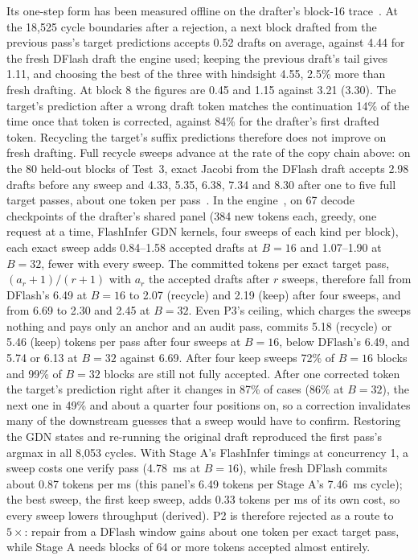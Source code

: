 Its one-step form has been measured offline on the drafter's block-16 trace~. At the 18,525 cycle boundaries after a rejection, a next block drafted from the previous pass's target predictions accepts 0.52 drafts on average, against 4.44 for the fresh DFlash draft the engine used; keeping the previous draft's tail gives 1.11, and choosing the best of the three with hindsight 4.55, 2.5\% more than fresh drafting. At block 8 the figures are 0.45 and 1.15 against 3.21 (3.30). The target's prediction after a wrong draft token matches the continuation 14\% of the time once that token is corrected, against 84\% for the drafter's first drafted token. Recycling the target's suffix predictions therefore does not improve on fresh drafting. Full recycle sweeps advance at the rate of the copy chain above: on the 80 held-out blocks of Test~3, exact Jacobi from the DFlash draft accepts 2.98 drafts before any sweep and 4.33, 5.35, 6.38, 7.34 and 8.30 after one to five full target passes, about one token per pass~. In the engine~, on 67 decode checkpoints of the drafter's shared panel (384 new tokens each, greedy, one request at a time, FlashInfer GDN kernels, four sweeps of each kind per block), each exact sweep adds 0.84--1.58 accepted drafts at $B=16$ and 1.07--1.90 at $B=32$, fewer with every sweep. The committed tokens per exact target pass, $(a_r+1)/(r+1)$ with $a_r$ the accepted drafts after $r$ sweeps, therefore fall from DFlash's 6.49 at $B=16$ to 2.07 (recycle) and 2.19 (keep) after four sweeps, and from 6.69 to 2.30 and 2.45 at $B=32$. Even P3's ceiling, which charges the sweeps nothing and pays only an anchor and an audit pass, commits 5.18 (recycle) or 5.46 (keep) tokens per pass after four sweeps at $B=16$, below DFlash's 6.49, and 5.74 or 6.13 at $B=32$ against 6.69. After four keep sweeps 72\% of $B=16$ blocks and 99\% of $B=32$ blocks are still not fully accepted. After one corrected token the target's prediction right after it changes in 87\% of cases (86\% at $B=32$), the next one in 49\% and about a quarter four positions on, so a correction invalidates many of the downstream guesses that a sweep would have to confirm. Restoring the GDN states and re-running the original draft reproduced the first pass's argmax in all 8,053 cycles. With Stage A's FlashInfer timings at concurrency 1, a sweep costs one verify pass (4.78~ms at $B=16$), while fresh DFlash commits about 0.87 tokens per ms (this panel's 6.49 tokens per Stage A's 7.46~ms cycle); the best sweep, the first keep sweep, adds 0.33 tokens per ms of its own cost, so every sweep lowers throughput (derived). P2 is therefore rejected as a route to $5\times$: repair from a DFlash window gains about one token per exact target pass, while Stage A needs blocks of 64 or more tokens accepted almost entirely.

